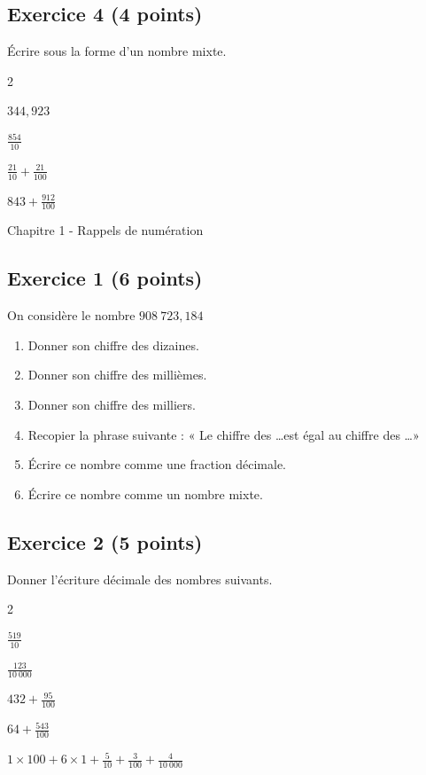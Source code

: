 \documentclass[14 pt]{extarticle}
\theoremstyle{plain}
\begin{document}
  \subsection*{Exercice 4 (4 points)}
Écrire sous la forme d'un nombre mixte. 
\begin{enumerate}\begin{multicols}{2}
\item $\displaystyle344,923$
\item $\displaystyle\frac{854}{10}$
\item $\displaystyle\frac{21}{10}+\frac{21}{100}$
\item $\displaystyle843 + \frac{912}{100}$
\end{multicols}
\end{enumerate}

\newpage
\begin{center}{\Large Chapitre 1 - Rappels de  numération}\\ 
 \end{center}
  
  \subsection*{Exercice 1 (6 points)}
  
  On considère le nombre $908\ 723, 184$
  
  \begin{enumerate}
  \item Donner son chiffre des dizaines. 
  \item Donner son chiffre des millièmes. 
  \item Donner son chiffre des milliers. 
  \item Recopier la phrase suivante : « Le chiffre des \ldots est égal au chiffre des \ldots »
  \item Écrire ce nombre comme une fraction décimale. 
  \item Écrire ce nombre comme un nombre mixte.
  \end{enumerate}
  
  \subsection*{Exercice 2 (5 points)}
  Donner l'écriture décimale des nombres suivants. 
  \begin{enumerate} \begin{multicols}{2}
  \item $\displaystyle\frac{519}{10}$
  \item $\displaystyle\frac{123}{10~000}$
  \item $\displaystyle432+ \frac{95}{100}$
  \item $\displaystyle64+\frac{543}{100}$
  \item $\displaystyle1\times 100 + 6 \times 1 + \frac5{10} + \frac3{100} + \frac4{10~000}$
  \end{multicols}
  \end{enumerate}
  
\end{document}
